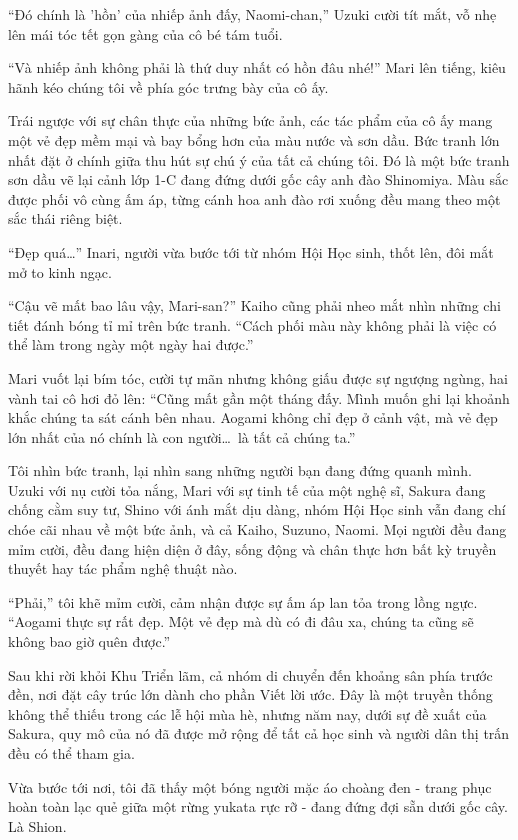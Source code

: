 \documentclass[../main.tex]{subfiles}
\begin{document}
``Đó chính là 'hồn' của nhiếp ảnh đấy, Naomi-chan,'' Uzuki cười tít mắt, vỗ nhẹ lên mái tóc tết gọn gàng của cô bé tám tuổi.

``Và nhiếp ảnh không phải là thứ duy nhất có hồn đâu nhé!'' Mari lên tiếng, kiêu hãnh kéo chúng tôi về phía góc trưng bày của cô ấy.

Trái ngược với sự chân thực của những bức ảnh, các tác phẩm của cô ấy mang một vẻ đẹp mềm mại và bay bổng hơn của màu nước và sơn dầu. Bức tranh lớn nhất đặt ở chính giữa thu hút sự chú ý của tất cả chúng tôi. Đó là một bức tranh sơn dầu vẽ lại cảnh lớp 1-C đang đứng dưới gốc cây anh đào Shinomiya. Màu sắc được phối vô cùng ấm áp, từng cánh hoa anh đào rơi xuống đều mang theo một sắc thái riêng biệt.

``Đẹp quá\dots'' Inari, người vừa bước tới từ nhóm Hội Học sinh, thốt lên, đôi mắt mở to kinh ngạc.

``Cậu vẽ mất bao lâu vậy, Mari-san?'' Kaiho cũng phải nheo mắt nhìn những chi tiết đánh bóng tỉ mỉ trên bức tranh. ``Cách phối màu này không phải là việc có thể làm trong ngày một ngày hai được.''

Mari vuốt lại bím tóc, cười tự mãn nhưng không giấu được sự ngượng ngùng, hai vành tai cô hơi đỏ lên: ``Cũng mất gần một tháng đấy. Mình muốn ghi lại khoảnh khắc chúng ta sát cánh bên nhau. Aogami không chỉ đẹp ở cảnh vật, mà vẻ đẹp lớn nhất của nó chính là con người\dots\ là tất cả chúng ta.''

Tôi nhìn bức tranh, lại nhìn sang những người bạn đang đứng quanh mình. Uzuki với nụ cười tỏa nắng, Mari với sự tinh tế của một nghệ sĩ, Sakura đang chống cằm suy tư, Shino với ánh mắt dịu dàng, nhóm Hội Học sinh vẫn đang chí chóe cãi nhau về một bức ảnh, và cả Kaiho, Suzuno, Naomi. Mọi người đều đang mỉm cười, đều đang hiện diện ở đây, sống động và chân thực hơn bất kỳ truyền thuyết hay tác phẩm nghệ thuật nào.

``Phải,'' tôi khẽ mỉm cười, cảm nhận được sự ấm áp lan tỏa trong lồng ngực. ``Aogami thực sự rất đẹp. Một vẻ đẹp mà dù có đi đâu xa, chúng ta cũng sẽ không bao giờ quên được.''


\ct

Sau khi rời khỏi Khu Triển lãm, cả nhóm di chuyển đến khoảng sân phía trước đền, nơi đặt cây trúc lớn dành cho phần Viết lời ước. Đây là một truyền thống không thể thiếu trong các lễ hội mùa hè, nhưng năm nay, dưới sự đề xuất của Sakura, quy mô của nó đã được mở rộng để tất cả học sinh và người dân thị trấn đều có thể tham gia.

Vừa bước tới nơi, tôi đã thấy một bóng người mặc áo choàng đen - trang phục hoàn toàn lạc quẻ giữa một rừng yukata rực rỡ - đang đứng đợi sẵn dưới gốc cây. Là Shion.
\end{document}
